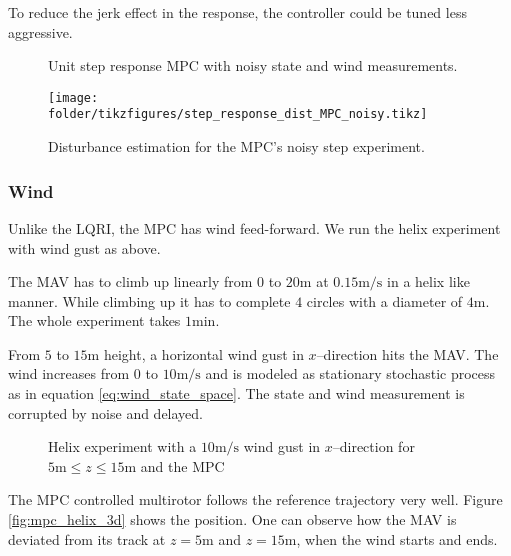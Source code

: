 To reduce the jerk effect in the response, the controller could be tuned less aggressive.

\begin{figure}
\centering
{}
\qquad
{}
\caption{Unit step response MPC with noisy state and wind measurements.}
\label{fig:mpc_step_noisy}
\end{figure}

\begin{figure}
\centering
\texttt{[image: \\folder/tikzfigures/step\_response\_dist\_MPC\_noisy.tikz]}
\caption{Disturbance estimation for the MPC's noisy step experiment.}
\label{fig:mpc_step_dist_noisy}
\end{figure}

\subsubsection{Wind}
Unlike the LQRI, the MPC has wind feed-forward. We run the helix experiment with wind gust as above.

The MAV has to climb up linearly from $0$ to $20 \si{\metre}$ at $0.15 \si{\metre\per\second}$ in a helix like manner. While climbing up it has to complete $4$ circles with a diameter of $4\si{\metre}$. The whole experiment takes $1 \si{\minute}$. 

From $5$ to $15 \si{\metre}$ height, a horizontal wind gust in $x$--direction hits the MAV. The wind increases from $0$ to $10 \si{\metre\per\second}$ and is modeled as stationary stochastic process as in equation \ref{eq:wind_state_space}. The state and wind measurement is corrupted by noise and delayed.

\begin{figure}
\centering
{}
\qquad
{}
\caption{Helix experiment with a $10 \si{\metre\per\second}$ wind gust in $x$--direction for $5 \si{\metre} \leq z \leq 15 \si{\metre}$ and the MPC}
\label{fig:mpc_helix}
\end{figure}

The MPC controlled multirotor follows the reference trajectory very well. Figure \ref{fig:mpc_helix_3d} shows the position. One can observe how the MAV is deviated from its track at $z=5\si{\metre}$ and $z=15\si{\metre}$, when the wind starts and ends. 


